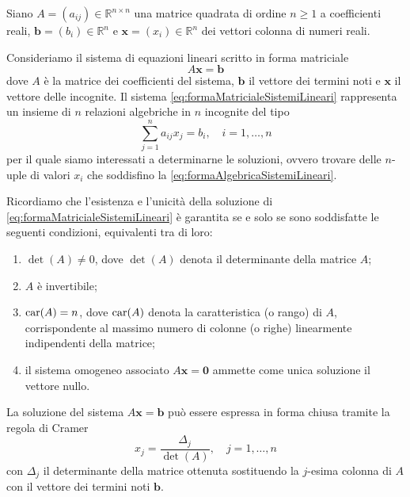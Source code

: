 \nocite{Quarteroni2000}
\nocite{Quarteroni1997}
Siano $A=(a_{ij})\in\mathbb{R}^{n\times n}$ una matrice quadrata di ordine $n\ge1$ a coefficienti reali, $\bm{b}=(b_{i})\in\mathbb{R}^{n}$ 
e $\bm{x}=(x_{i})\in\mathbb{R}^{n}$ dei vettori colonna di numeri reali.

Consideriamo il sistema di equazioni lineari scritto in forma matriciale
\begin{equation}
\label{eq:formaMatricialeSistemiLineari}
A\bm{x}=\bm{b}
\end{equation}
dove $A$ \`e la matrice dei coefficienti del sistema, $\bm{b}$ il vettore dei termini noti e $\bm{x}$ il vettore delle incognite.\newline
Il sistema \eqref{eq:formaMatricialeSistemiLineari} rappresenta un insieme di $n$ relazioni algebriche in 
$n$ incognite del tipo
\begin{equation}
\label{eq:formaAlgebricaSistemiLineari}
\sum_{j=1}^{n}a_{ij}x_{j}=b_{i},\quad i = 1, \dots, n
\end{equation}
per il quale siamo interessati a determinarne le soluzioni, ovvero trovare delle $n$-uple di valori $x_{i}$ che 
soddisfino la \eqref{eq:formaAlgebricaSistemiLineari}.

Ricordiamo che l'esistenza e l'unicit\`a della soluzione di \eqref{eq:formaMatricialeSistemiLineari} \`e garantita se e solo se sono soddisfatte 
le seguenti condizioni, equivalenti tra di loro:
\begin{enumerate}
    \item $\det(A)\ne 0$, dove $\det(A)$ denota il determinante della matrice $A$;
    \item $A$ \`e invertibile;
    \item $\operatorname{car}(A)= n$, dove $\operatorname{car}(A)$ denota la caratteristica (o rango) di $A$, corrispondente al massimo numero di colonne (o righe) linearmente indipendenti della matrice;
    \item il sistema omogeneo associato $A\bm{x}=\bm{0}$ ammette come unica soluzione il vettore nullo.
\end{enumerate}

La soluzione del sistema $A\bm{x}=\bm{b}$ pu\`o essere espressa in forma chiusa tramite la regola di Cramer
\begin{equation}
    x_{j} = \frac{\Delta_{j}}{\det(A)},\quad j = 1, \dots, n
\end{equation}
con $\Delta_{j}$ il determinante della matrice ottenuta sostituendo la $j$-esima colonna di $A$ con il vettore dei termini noti $\bm{b}$.

